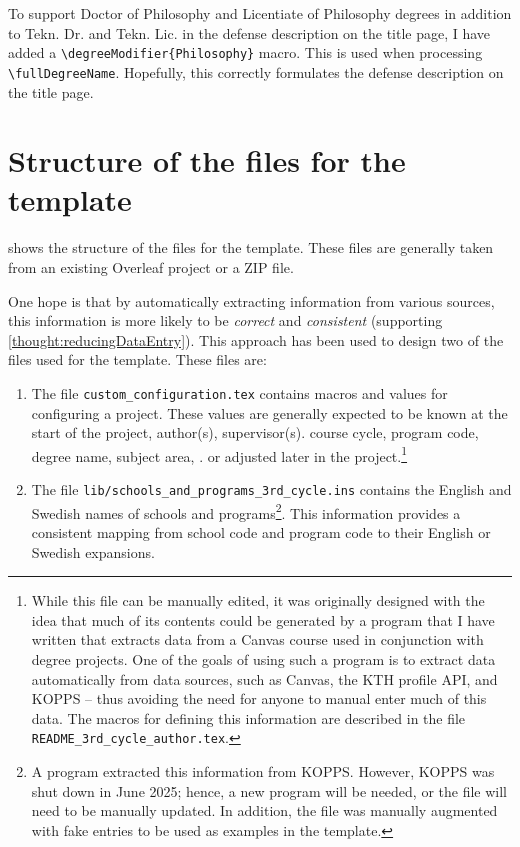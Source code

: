 \documentclass[12pt, twoside]{article}
\newcommand{\fname}[1]{\texttt{#1}}
\begin{document}
To support Doctor of Philosophy and Licentiate of Philosophy degrees in addition to Tekn. Dr. and Tekn. Lic. in the defense description on the title page, I have added a \texttt{\textbackslash degreeModifier\{Philosophy\}} macro. This is used when processing \texttt{\textbackslash fullDegreeName}. Hopefully, this correctly formulates the defense description on the title page.

\section{Structure of the files for the template}
 shows the structure of the files for the template. These files are generally taken from an existing Overleaf project or a ZIP file.

One hope is that by automatically extracting information from various sources, this information is more likely to be \textit{correct} and \textit{consistent} (supporting \ref{thought:reducingDataEntry}). This approach has been used to design two of the files used for the template. These files are:
\begin{enumerate}
    \item The file \fname{custom\_configuration.tex} contains macros and values for configuring a project. These values are generally expected to be known at the start of the project, \eg author(s), supervisor(s). course cycle, program code, degree name, subject area, \etc. or adjusted later in the project.\footnote{While this file can be manually edited, it was originally designed with the idea that much of its contents could be generated by a program that I have written that extracts data from a Canvas course used in conjunction with degree projects. One of the goals of using such a program is to extract data automatically from data sources, such as Canvas, the \gls{KTH} profile \gls{API}, and \gls{KOPPS}
    -- thus avoiding the need for anyone to manual enter much of this data. The macros for defining this information are described in the file \fname{README\_3rd\_cycle\_author.tex}.}

    \item The file \fname{lib/schools\_and\_programs\_3rd\_cycle.ins} contains the English and Swedish names of schools and programs\footnote{A program extracted this information from KOPPS. However, KOPPS was shut down in June 2025; hence, a new program will be needed, or the file will need to be manually updated. In addition, the file was manually augmented with fake entries to be used as examples in the template.}. This information provides a consistent mapping from school code and program code to their English or Swedish expansions.
\end{enumerate}
\end{document}
